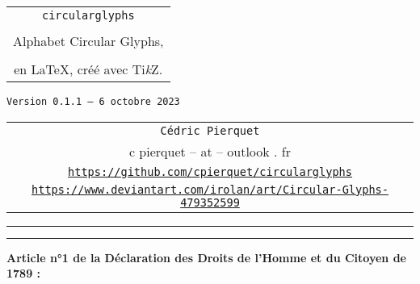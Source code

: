 \documentclass[french,11pt,a4paper]{article}
\providecommand\tikzlogo{Ti\textit{k}Z}
\let\TikZ\tikzlogo
\def\TPversion{0.1.1}
\def\TPdate{6 octobre 2023}
\begin{document}
\pagestyle{fancy}

\thispagestyle{empty}

\begin{center}
	\begin{minipage}{0.75\linewidth}
	\begin{tcolorbox}[colframe=yellow,colback=yellow!15]
		\begin{center}
			\begin{tabular}{c}
				{\Huge \texttt{circularglyphs}}\\
				\\
				{\LARGE Alphabet Circular Glyphs,} \\
				\\
				{\LARGE en \LaTeX, créé avec \TikZ.} \\
			\end{tabular}
			
			\medskip
			
			{\small \texttt{Version \TPversion{} -- \TPdate}}
		\end{center}
	\end{tcolorbox}
\end{minipage}
\end{center}

\vspace*{1mm}

\begin{center}
	\begin{tabular}{c}
	\texttt{Cédric Pierquet}\\
	{\ttfamily c pierquet -- at -- outlook . fr}\\
	\texttt{\url{https://github.com/cpierquet/circularglyphs}}
	\\
	\texttt{\url{https://www.deviantart.com/irolan/art/Circular-Glyphs-479352599}}
\end{tabular}
\end{center}

\hrule


\hypertarget{matoc}{}

\tableofcontents

\vspace*{5mm}

\hrule

\vspace*{5mm}

\vfill

\textbf{Article n°1 de la Déclaration des Droits de l'Homme et du Citoyen de 1789 : }
\end{document}
